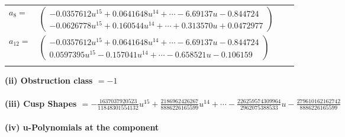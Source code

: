 \documentclass[1p]{elsarticle_modified}
\theoremstyle{definition}
\begin{document}
\begin{tabular}{m{7pt} m{180pt} m{7pt} m{180pt} }
\flushright $a_{8}=$&$\begin{pmatrix}-0.0357612 u^{15}+0.0641648 u^{14}+\cdots-6.69137 u-0.844724\\-0.0626778 u^{15}+0.160544 u^{14}+\cdots+0.313570 u+0.0472977\end{pmatrix}$ \\
\flushright $a_{12}=$&$\begin{pmatrix}-0.0357612 u^{15}+0.0641648 u^{14}+\cdots-6.69137 u-0.844724\\0.0597395 u^{15}-0.157041 u^{14}+\cdots-0.658521 u-0.106159\end{pmatrix}$\\&\end{tabular}
\flushleft \textbf{(ii) Obstruction class $= -1$}\\~\\
\flushleft \textbf{(iii) Cusp Shapes $= -\frac{1637037920523}{11848301554132} u^{15}+\frac{2186962426267}{8886226165599} u^{14}+\cdots-\frac{226259574309964}{2962075388533} u-\frac{279610162162742}{8886226165599}$}\\~\\
\newpage\renewcommand{\arraystretch}{1}
\flushleft \textbf{(iv) u-Polynomials at the component}\newline \\
\end{document}
